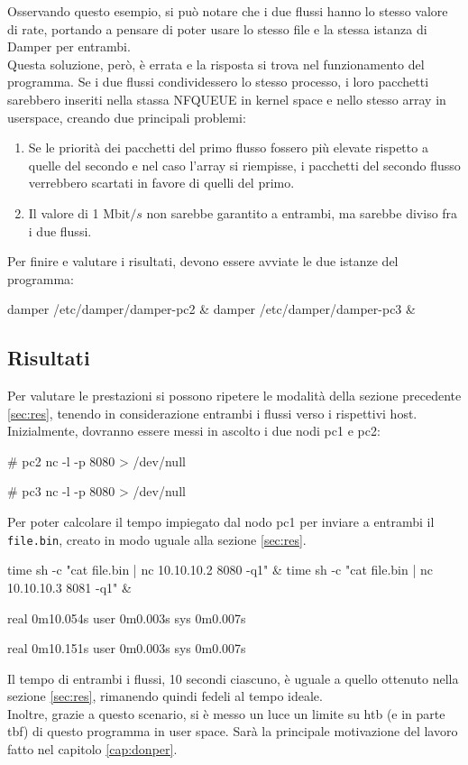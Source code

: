 Osservando questo esempio, si può notare che i due flussi hanno lo stesso valore di rate, portando a pensare di poter usare lo stesso file e la stessa istanza di Damper per entrambi. \\
Questa soluzione, però, è errata e la risposta si trova nel funzionamento del programma. Se i due flussi condividessero lo stesso processo,
i loro pacchetti sarebbero inseriti nella stassa NFQUEUE in kernel space e nello stesso array in userspace, creando due principali problemi:
\begin{enumerate}
  \item Se le priorità dei pacchetti del primo flusso fossero più elevate rispetto a quelle del secondo e nel caso l'array si riempisse, i pacchetti del secondo flusso verrebbero scartati in favore di quelli del primo.
  \item Il valore di 1 Mbit$/s$ non sarebbe garantito a entrambi, ma sarebbe diviso fra i due flussi.
\end{enumerate}
Per finire e valutare i risultati, devono essere avviate le due istanze del programma:
\begin{bash}
damper /etc/damper/damper-pc2 &
damper /etc/damper/damper-pc3 &
\end{bash}

\subsection{Risultati}
Per valutare le prestazioni si possono ripetere le modalità della sezione precedente \ref{sec:res}, tenendo in considerazione entrambi i flussi verso i rispettivi host. \\ 
Inizialmente, dovranno essere messi in ascolto i due nodi pc1 e pc2:
\begin{bash}[Server nc]
# pc2 
nc -l -p 8080 > /dev/null

# pc3
nc -l -p 8080 > /dev/null
\end{bash}
Per poter calcolare il tempo impiegato dal nodo pc1 per inviare a entrambi il \texttt{file.bin}, creato in modo uguale alla sezione \ref{sec:res}.

\begin{bash}[Nodo pc1]
time sh -c "cat file.bin | nc 10.10.10.2 8080 -q1" & time sh -c "cat file.bin | nc 10.10.10.3 8081 -q1" &
\end{bash}

\begin{bash}[Risultato]
real	0m10.054s
user	0m0.003s
sys	 0m0.007s

real	0m10.151s
user	0m0.003s
sys	 0m0.007s
\end{bash}
Il tempo di entrambi i flussi, 10 secondi ciascuno, è uguale a quello ottenuto nella sezione \ref{sec:res}, rimanendo quindi fedeli al tempo ideale. \\
Inoltre, grazie a questo scenario, si è messo un luce un limite su htb (e in parte tbf) di questo programma in user space. Sarà la principale motivazione del lavoro fatto nel capitolo \ref{cap:donper}.

